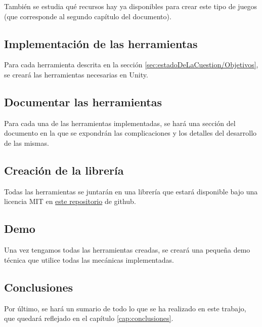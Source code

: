 También se estudia qué recursos hay ya disponibles para crear este tipo de juegos (que corresponde al segundo capítulo del documento).

\subsection{Implementación de las herramientas}
Para cada herramienta descrita en la sección \ref{sec:estadoDeLaCuestion/Objetivos}, se creará las herramientas necesarias en Unity.

\subsection{Documentar las herramientas}
Para cada una de las herramientas implementadas, se hará una sección del documento en la que se expondrán las complicaciones y los detalles del desarrollo de las mismas.

\subsection{Creación de la librería}
Todas las herramientas se juntarán en una librería que estará disponible bajo una licencia MIT en \href{https://github.com/NotNoe/TFG}{este repositorio} de github.

\subsection{Demo}
Una vez tengamos todas las herramientas creadas, se creará una pequeña demo técnica que utilice todas las mecánicas implementadas.

\subsection{Conclusiones}
Por último, se hará un sumario de todo lo que se ha realizado en este trabajo, que quedará reflejado en el capítulo \ref{cap:conclusiones}.

